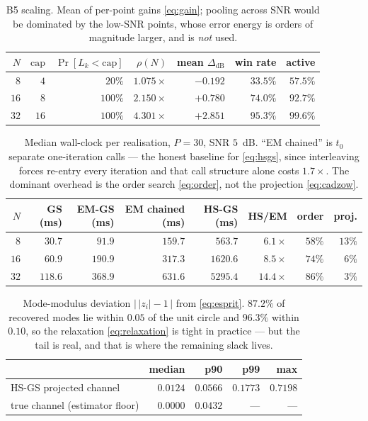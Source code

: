 \documentclass[11pt,a4paper]{article}
\newcommand{\dB}{\mathrm{dB}}
\begin{document}
\begin{table}[h]\centering
\begin{tabular}{@{}rrrrrrr@{}}
\toprule
$N$ & $\mathrm{cap}$ & $\Pr[L_k<\mathrm{cap}]$ & $\rho(N)$ & mean $\Delta_{\dB}$ & win rate & active\\
\midrule
$8$  & $4$  & $20\%$  & $1.075\times$ & $-0.192$ & $33.5\%$ & $57.5\%$\\
$16$ & $8$  & $100\%$ & $2.150\times$ & $+0.780$ & $74.0\%$ & $92.7\%$\\
$32$ & $16$ & $100\%$ & $4.301\times$ & $+2.851$ & $95.3\%$ & $99.6\%$\\
\bottomrule
\end{tabular}
\caption{B5 scaling. Mean of per-point gains \eqref{eq:gain}; pooling across
SNR would be dominated by the low-SNR points, whose error energy is orders of
magnitude larger, and is \emph{not} used.}
\end{table}

\begin{table}[h]\centering
\begin{tabular}{@{}rrrrrrrr@{}}
\toprule
$N$ & GS (ms) & EM-GS (ms) & EM chained (ms) & HS-GS (ms) & HS/EM & order & proj.\\
\midrule
$8$  & $30.7$  & $91.9$  & $159.7$ & $563.7$  & $6.1\times$  & $58\%$ & $13\%$\\
$16$ & $60.9$  & $190.9$ & $317.3$ & $1620.6$ & $8.5\times$  & $74\%$ & $6\%$\\
$32$ & $118.6$ & $368.9$ & $631.6$ & $5295.4$ & $14.4\times$ & $86\%$ & $3\%$\\
\bottomrule
\end{tabular}
\caption{Median wall-clock per realisation, $P=30$, SNR $5$~dB. ``EM chained''
is $t_0$ separate one-iteration calls --- the honest baseline for
\eqref{eq:hsgs}, since interleaving forces re-entry every iteration and that
call structure alone costs $1.7\times$. The dominant overhead is the order
search \eqref{eq:order}, not the projection \eqref{eq:cadzow}.}
\end{table}

\begin{table}[h]\centering
\begin{tabular}{@{}lrrrr@{}}
\toprule
& median & p90 & p99 & max\\
\midrule
HS-GS projected channel & $0.0124$ & $0.0566$ & $0.1773$ & $0.7198$\\
true channel (estimator floor) & $0.0000$ & $0.0432$ & --- & ---\\
\bottomrule
\end{tabular}
\caption{Mode-modulus deviation $\bigl|\,|z_i|-1\,\bigr|$ from
\eqref{eq:esprit}. $87.2\%$ of recovered modes lie within $0.05$ of the unit
circle and $96.3\%$ within $0.10$, so the relaxation \eqref{eq:relaxation} is
tight in practice --- but the tail is real, and that is where the remaining
slack lives.}
\end{table}
\end{document}
